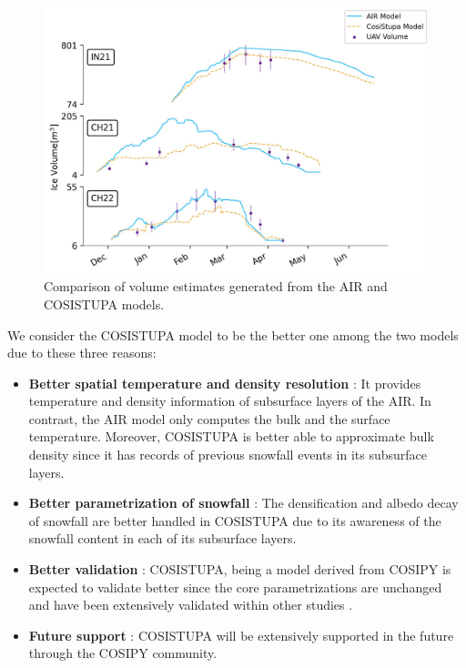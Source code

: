 \begin{figure}[t]
	\centering
	\includegraphics[width=\textwidth]{figs/model_compare.jpg}

	\caption{Comparison of volume estimates generated from the AIR and COSISTUPA models.}

	\label{fig:Cosistupa}
\end{figure}

We consider the COSISTUPA model to be the better one among the two models due to these three reasons:

\begin{itemize}

	\item \textbf{Better spatial temperature and density resolution} : It provides temperature and density
	      information of subsurface layers of the AIR. In contrast, the AIR model only computes the bulk and the
	      surface temperature. Moreover, COSISTUPA is better able to approximate bulk density since it has records of
	      previous snowfall events in its subsurface layers.

	\item \textbf{Better parametrization of snowfall} : The densification and albedo decay of snowfall are better
	      handled in COSISTUPA due to its awareness of the snowfall content in each of its subsurface layers.

	\item \textbf{Better validation} : COSISTUPA, being a model derived from COSIPY is expected to validate better
	      since the core parametrizations are unchanged and have been extensively validated within other studies \citep{arndtAtmosphereDrivenMassBalance2021}.

	\item \textbf{Future support} : COSISTUPA will be extensively supported in the future through the COSIPY
	      community.

\end{itemize}


